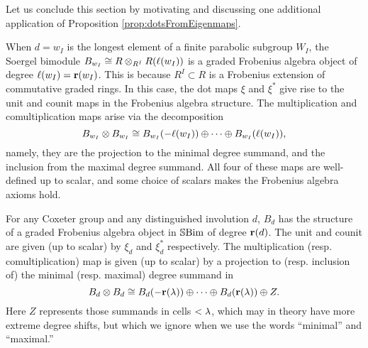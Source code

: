 
Let us conclude this section by motivating and discussing one additional application of Proposition \ref{prop:dotsFromEigenmaps}.

When $d = w_I$ is the longest element of a finite parabolic subgroup $W_I$, the Soergel bimodule $B_{w_I} \cong R \otimes_{R^I} R(\ell(w_I))$ is a graded Frobenius algebra object of degree $\ell(w_I) = \mathbf{r}(w_I)$. This is because $R^I \subset R$ is a Frobenius extension of commutative graded rings. In this case, the dot maps $\xi$ and $\xi^\ast$ give rise to the unit and counit maps in the Frobenius algebra structure. The multiplication and comultiplication maps arise via the decomposition 
\[ B_{w_I} \otimes B_{w_I} \cong B_{w_I}(-\ell(w_I)) \oplus \cdots \oplus B_{w_I}(\ell(w_I)),\]
namely, they are the projection to the minimal degree summand, and the inclusion from the maximal degree summand. All four of these maps are well-defined up to scalar, and some choice of scalars makes the Frobenius algebra axioms hold.

\begin{conj} For any Coxeter group and any distinguished involution $d$, $B_d$ has the structure of a graded Frobenius algebra object in ${\mathbb{S}}{\rm Bim }$ of degree $\mathbf{r}(d)$. The unit and counit are given (up to scalar) by $\xi_d$ and $\xi_d^\ast$ respectively. The multiplication (resp. comultiplication) map is given (up to scalar) by a projection to (resp. inclusion of) the minimal (resp. maximal) degree summand in
\[ B_d \otimes B_d \cong B_d(-\mathbf{r}(\lambda)) \oplus \cdots \oplus B_d(\mathbf{r}(\lambda)) \oplus Z. \]
Here $Z$ represents those summands in cells $< \lambda$, which may in theory have more extreme degree shifts, but which we ignore when we use the words ``minimal'' and ``maximal.''
\end{conj}


